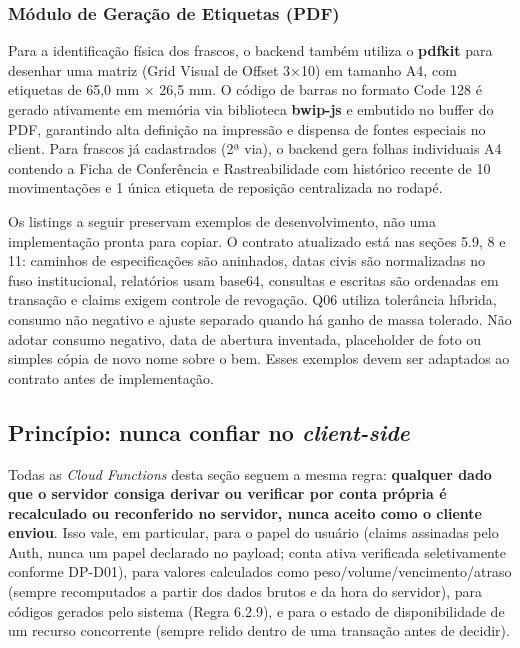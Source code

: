 \subsubsection{Módulo de Geração de Etiquetas (PDF)}
Para a identificação física dos frascos, o backend também utiliza o \textbf{pdfkit} para desenhar uma matriz (Grid Visual de Offset 3×10) em tamanho A4, com etiquetas de 65,0 mm × 26,5 mm. O código de barras no formato Code 128 é gerado ativamente em memória via biblioteca \textbf{bwip-js} e embutido no buffer do PDF, garantindo alta definição na impressão e dispensa de fontes especiais no client. Para frascos já cadastrados (2ª via), o backend gera folhas individuais A4 contendo a Ficha de Conferência e Rastreabilidade com histórico recente de 10 movimentações e 1 única etiqueta de reposição centralizada no rodapé.

\begin{explicacao}
Os listings a seguir preservam exemplos de desenvolvimento, não uma implementação pronta para copiar. O contrato atualizado está nas seções 5.9, 8 e 11: caminhos de especificações são aninhados, datas civis são normalizadas no fuso institucional, relatórios usam base64, consultas e escritas são ordenadas em transação e claims exigem controle de revogação. Q06 utiliza tolerância híbrida, consumo não negativo e ajuste separado quando há ganho de massa tolerado. Não adotar consumo negativo, data de abertura inventada, placeholder de foto ou simples cópia de novo nome sobre o bem. Esses exemplos devem ser adaptados ao contrato antes de implementação.
\end{explicacao}

\subsection{Princípio: nunca confiar no \textit{client-side}}
Todas as \textit{Cloud Functions} desta seção seguem a mesma regra: \textbf{qualquer dado que o servidor consiga derivar ou verificar por conta própria é recalculado ou reconferido no servidor, nunca aceito como o cliente enviou}. Isso vale, em particular, para o papel do usuário (claims assinadas pelo Auth, nunca um papel declarado no payload; conta ativa verificada seletivamente conforme DP-D01), para valores calculados como peso/volume/vencimento/atraso (sempre recomputados a partir dos dados brutos e da hora do servidor), para códigos gerados pelo sistema (Regra 6.2.9), e para o estado de disponibilidade de um recurso concorrente (sempre relido dentro de uma transação antes de decidir).

